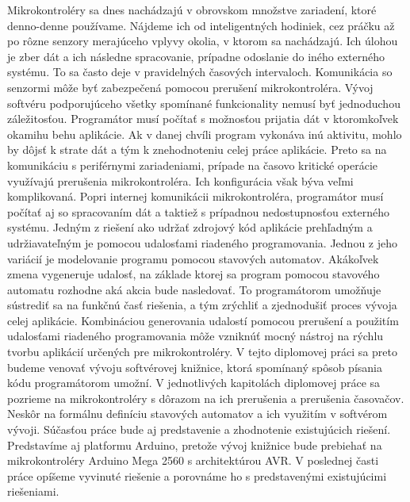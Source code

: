 
Mikrokontroléry sa dnes nachádzajú v obrovskom množstve zariadení, ktoré denno-denne používame. Nájdeme ich od inteligentných hodiniek, cez práčku až po rôzne senzory merajúceho vplyvy okolia,
v ktorom sa nachádzajú. Ich úlohou je zber dát a ich následne spracovanie, prípadne odoslanie do iného externého systému. To sa často deje v pravidelných časových intervaloch. Komunikácia
so senzormi môže byť zabezpečená pomocou prerušení mikrokontroléra. Vývoj softvéru podporujúceho všetky spomínané funkcionality nemusí byť jednoduchou záležitosťou. Programátor musí počítať
s možnosťou prijatia dát v ktoromkoľvek okamihu behu aplikácie. Ak v danej chvíli program vykonáva inú aktivitu, mohlo by dôjsť k strate dát a tým k znehodnoteniu celej práce aplikácie. Preto
sa na komunikáciu s periférnymi zariadeniami, prípade na časovo kritické operácie využívajú prerušenia mikrokontroléra. Ich konfigurácia však býva veľmi komplikovaná.  Popri internej
komunikácii mikrokontroléra, programátor musí počítať aj so spracovaním dát a taktiež s prípadnou nedostupnosťou externého systému. Jedným z riešení ako udržať zdrojový kód aplikácie
prehľadným a udržiavateľným je pomocou udalosťami riadeného programovania. Jednou z jeho variácií je modelovanie programu pomocou stavových automatov. Akákoľvek zmena vygeneruje udalosť,
na základe ktorej sa program pomocou stavového automatu rozhodne aká akcia bude nasledovať. To programátorom umožňuje sústrediť sa na funkčnú časť riešenia, a tým zrýchliť a zjednodušiť proces
vývoja celej aplikácie. Kombináciou generovania udalostí pomocou prerušení a použitím udalosťami riadeného programovania môže vzniknúť mocný nástroj na rýchlu tvorbu aplikácií určených
pre mikrokontroléry. V tejto diplomovej práci sa preto budeme venovať vývoju softvérovej knižnice, ktorá spomínaný spôsob písania kódu programátorom umožní. V jednotlivých kapitolách
diplomovej práce sa pozrieme na mikrokontroléry s dôrazom na ich prerušenia a prerušenia časovačov. Neskôr na formálnu definíciu stavových automatov a ich využitím v softvérom vývoji. Súčasťou
práce bude aj predstavenie a zhodnotenie existujúcich riešení. Predstavíme aj platformu Arduino, pretože vývoj knižnice bude prebiehať na mikrokontroléry Arduino Mega 2560 s architektúrou AVR.
V poslednej časti práce opíšeme vyvinuté riešenie a porovnáme ho s predstavenými existujúcimi riešeniami.
